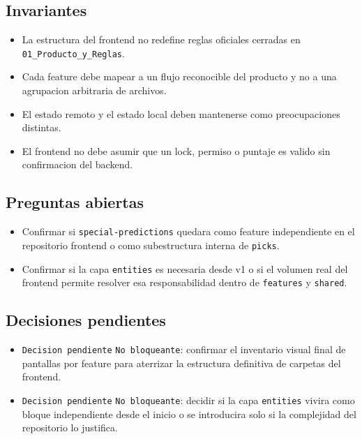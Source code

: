 \subsection{Invariantes}

\begin{itemize}
  \item La estructura del frontend no redefine reglas oficiales cerradas en \texttt{01\_Producto\_y\_Reglas}.
  \item Cada feature debe mapear a un flujo reconocible del producto y no a una agrupacion arbitraria de archivos.
  \item El estado remoto y el estado local deben mantenerse como preocupaciones distintas.
  \item El frontend no debe asumir que un lock, permiso o puntaje es valido sin confirmacion del backend.
\end{itemize}

\subsection{Preguntas abiertas}

\begin{itemize}
  \item Confirmar si \texttt{special-predictions} quedara como feature independiente en el repositorio frontend o como subestructura interna de \texttt{picks}.
  \item Confirmar si la capa \texttt{entities} es necesaria desde v1 o si el volumen real del frontend permite resolver esa responsabilidad dentro de \texttt{features} y \texttt{shared}.
\end{itemize}

\subsection{Decisiones pendientes}

\begin{itemize}
  \item \texttt{Decision pendiente} \texttt{No bloqueante}: confirmar el inventario visual final de pantallas por feature para aterrizar la estructura definitiva de carpetas del frontend.
  \item \texttt{Decision pendiente} \texttt{No bloqueante}: decidir si la capa \texttt{entities} vivira como bloque independiente desde el inicio o se introducira solo si la complejidad del repositorio lo justifica.
\end{itemize}
